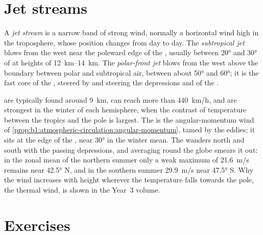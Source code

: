 \section{Jet streams}\label{sec:b1:atmospheric-circulation:jets}

\begin{definition}\label{def:b1:atmospheric-circulation:jet}
A \emph{jet stream} is a narrow band of strong wind, normally a
horizontal wind high in the troposphere, whose position changes from day to day. The
\emph{subtropical jet} blows from the west near the poleward
edge of the , usually between \ang{20} and \ang{30} of  at heights
of \qtyrange{12}{14}{km}. The \emph{polar-front jet} blows
from the west above the boundary between polar and subtropical air, between about
\ang{50} and \ang{60}; it is the fast core of the , steered by and steering
the depressions and  of the .
\end{definition}

 are typically found around \qty{9}{km}, can reach more than
\qty{440}{km/h}, and are strongest in the winter of each hemisphere, when the contrast
of temperature between the tropics and the pole is largest. The  is
the angular-momentum wind of \cref{prop:b1:atmospheric-circulation:angular-momentum},
tamed by the eddies; it sits at the edge of the , near \ang{30} in the
winter mean. The  wanders north and south with the passing
depressions, and averaging round the globe smears it out: in the zonal mean of the
northern summer only a weak maximum of \qty{21.6}{m/s} remains near \ang{42.5} N,
and in the southern summer \qty{29.9}{m/s} near \ang{47.5} S. Why the wind increases
with height wherever the temperature falls towards the pole, the thermal wind, is
shown in the Year~3 volume.

\section{Exercises}

